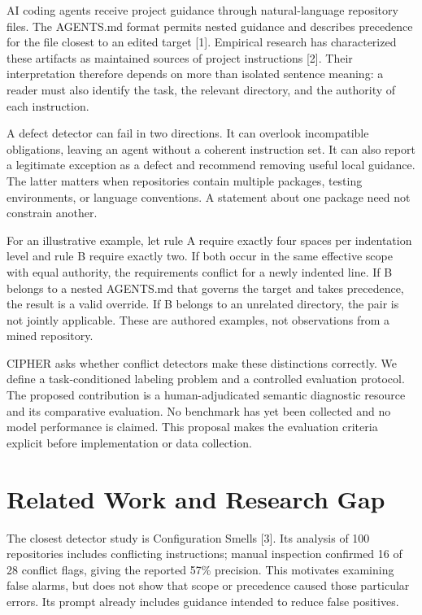 \documentclass[10pt,conference]{IEEEtran}
\begin{document}
AI coding agents receive project guidance through natural-language repository files. The AGENTS.md format permits nested guidance and describes precedence for the file closest to an edited target [1]. Empirical research has characterized these artifacts as maintained sources of project instructions [2]. Their interpretation therefore depends on more than isolated sentence meaning: a reader must also identify the task, the relevant directory, and the authority of each instruction.


A defect detector can fail in two directions. It can overlook incompatible obligations, leaving an agent without a coherent instruction set. It can also report a legitimate exception as a defect and recommend removing useful local guidance. The latter matters when repositories contain multiple packages, testing environments, or language conventions. A statement about one package need not constrain another.


For an illustrative example, let rule A require exactly four spaces per indentation level and rule B require exactly two. If both occur in the same effective scope with equal authority, the requirements conflict for a newly indented line. If B belongs to a nested AGENTS.md that governs the target and takes precedence, the result is a valid override. If B belongs to an unrelated directory, the pair is not jointly applicable. These are authored examples, not observations from a mined repository.


CIPHER asks whether conflict detectors make these distinctions correctly. We define a task-conditioned labeling problem and a controlled evaluation protocol. The proposed contribution is a human-adjudicated semantic diagnostic resource and its comparative evaluation. No benchmark has yet been collected and no model performance is claimed. This proposal makes the evaluation criteria explicit before implementation or data collection.


\section{Related Work and Research Gap}

The closest detector study is Configuration Smells [3]. Its analysis of 100 repositories includes conflicting instructions; manual inspection confirmed 16 of 28 conflict flags, giving the reported 57\% precision. This motivates examining false alarms, but does not show that scope or precedence caused those particular errors. Its prompt already includes guidance intended to reduce false positives.
\end{document}
